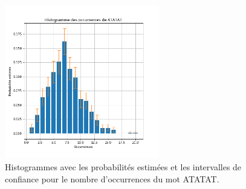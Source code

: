 \documentclass[a4paper,12pt]{article}
\begin{document}
\begin{figure}
\centering
\includegraphics[width=0.6\textwidth]{Figures/histogramme_ATATAT_errorbar.png}
\caption{Histogrammes avec les probabilités estimées et les intervalles de confiance pour le nombre d'occurrences du mot ATATAT.}
\label{FigHistogrammeErrorBar}
\end{figure}
\end{document}
